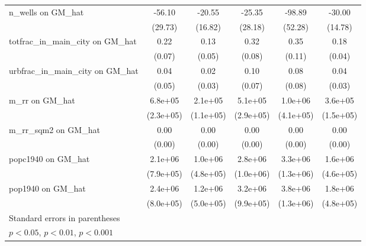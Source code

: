 \begin{table}[htbp]
\begin{tabular}{l*{5}{c}}
\addlinespace
n\_wells on GM\_hat&   -56.10         &   -20.55         &   -25.35         &   -98.89         &   -30.00\sym{*}  \\
                &  (29.73)         &  (16.82)         &  (28.18)         &  (52.28)         &  (14.78)         \\
\addlinespace
totfrac\_in\_main\_city on GM\_hat&     0.22\sym{**} &     0.13\sym{**} &     0.32\sym{***}&     0.35\sym{**} &     0.18\sym{***}\\
                &   (0.07)         &   (0.05)         &   (0.08)         &   (0.11)         &   (0.04)         \\
\addlinespace
urbfrac\_in\_main\_city on GM\_hat&     0.04         &     0.02         &     0.10         &     0.08         &     0.04         \\
                &   (0.05)         &   (0.03)         &   (0.07)         &   (0.08)         &   (0.03)         \\
\addlinespace
m\_rr on GM\_hat  &  6.8e+05\sym{**} &  2.1e+05         &  5.1e+05         &  1.0e+06\sym{*}  &  3.6e+05\sym{*}  \\
                &(2.3e+05)         &(1.1e+05)         &(2.9e+05)         &(4.1e+05)         &(1.5e+05)         \\
\addlinespace
m\_rr\_sqm2 on GM\_hat&     0.00         &     0.00\sym{*}  &     0.00\sym{**} &     0.00         &     0.00\sym{**} \\
                &   (0.00)         &   (0.00)         &   (0.00)         &   (0.00)         &   (0.00)         \\
\addlinespace
popc1940 on GM\_hat&  2.1e+06\sym{**} &  1.0e+06\sym{*}  &  2.8e+06\sym{**} &  3.3e+06\sym{*}  &  1.6e+06\sym{***}\\
                &(7.9e+05)         &(4.8e+05)         &(1.0e+06)         &(1.3e+06)         &(4.6e+05)         \\
\addlinespace
pop1940 on GM\_hat&  2.4e+06\sym{**} &  1.2e+06\sym{*}  &  3.2e+06\sym{**} &  3.8e+06\sym{**} &  1.8e+06\sym{***}\\
                &(8.0e+05)         &(5.0e+05)         &(9.9e+05)         &(1.3e+06)         &(4.8e+05)         \\
\bottomrule
\multicolumn{6}{l}{\footnotesize Standard errors in parentheses}\\
\multicolumn{6}{l}{\footnotesize \sym{*} \(p<0.05\), \sym{**} \(p<0.01\), \sym{***} \(p<0.001\)}\\
\end{tabular}
\end{table}
